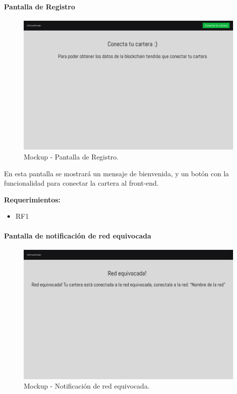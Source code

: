 \paragraph{Pantalla de Registro}
\begin{figure}[H]
        \centering
        \includegraphics[width=1\textwidth]{img/mockups/pantalla_registro.png}
        \caption{Mockup - Pantalla de Registro.}
        \label{fig:configApi}
\end{figure}

En esta pantalla se mostrará un mensaje de bienvenida, y un botón con la funcionalidad para conectar la cartera al front-end.

\bigskip

\textbf{Requerimientos: }
\begin{itemize}
    \item RF1
\end{itemize}


\paragraph{Pantalla de notificación de red equivocada}
\begin{figure}[H]
        \centering
        \includegraphics[width=1\textwidth]{img/mockups/red_equivocada.png}
        \caption{Mockup - Notificación de red equivocada.}
        \label{fig:configApi}
\end{figure}

